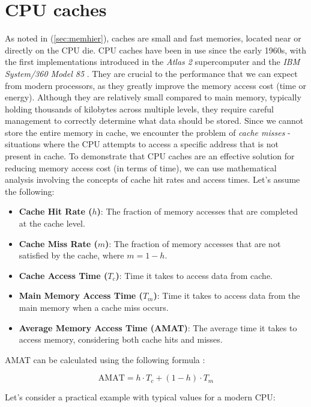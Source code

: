 \section{CPU caches}

As noted in (\ref{sec:memhier}), caches are small and fast memories, located near or directly on the CPU die. CPU caches have been in use since the early 1960s, with the first
implementations introduced in the \textit{Atlas 2} supercomputer \cite{oldcomputercache2} and the \textit{IBM System/360 Model 85} \cite{oldcomputercache1}. They are crucial to the
performance that we can expect from modern processors, as they greatly improve the memory access cost (time or energy). Although they are relatively small compared to main memory,
typically holding thousands of kilobytes across multiple levels, they require careful management to correctly determine what data should be stored. Since we cannot
store the entire memory in cache, we encounter the problem of \textit{cache misses} - situations where the CPU attempts to access a specific address that is not present in 
cache. To demonstrate that CPU caches are an effective solution for reducing memory access cost (in terms of time), we can use mathematical analysis involving the concepts of cache
hit rates and access times. Let's assume the following:

\begin{itemize}
    \item \textbf{Cache Hit Rate ($h$)}: The fraction of memory accesses that are completed at the cache level.
    \item \textbf{Cache Miss Rate ($m$)}: The fraction of memory accesses that are not satisfied by the cache, where $m = 1 - h$.
    \item \textbf{Cache Access Time ($T_c$)}: Time it takes to access data from cache.
    \item \textbf{Main Memory Access Time ($T_m$)}: Time it takes to access data from the main memory when a cache miss occurs.
    \item \textbf{Average Memory Access Time (AMAT)}: The average time it takes to access memory, considering both cache hits and misses.
\end{itemize}

\noindent AMAT can be calculated using the following formula \cite{Patterson2013}:

\[
\text{AMAT} = h \cdot T_c + (1 - h) \cdot T_m
\]

\noindent Let's consider a practical example with typical values for a modern CPU:

